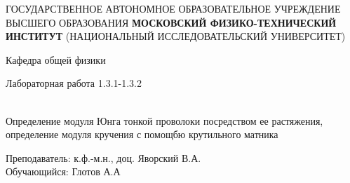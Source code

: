 \documentclass[12pt,a4paper]{article}
\author{Глотов Алексей}
\begin{document}
\newpage
\begin{center}
\footnotesize{{ГОСУДАРСТВЕННОЕ АВТОНОМНОЕ ОБРАЗОВАТЕЛЬНОЕ УЧРЕЖДЕНИЕ}\break
{ВЫСШЕГО ОБРАЗОВАНИЯ}
\break
{\bf {МОСКОВСКИЙ ФИЗИКО-ТЕХНИЧЕСКИЙ ИНСТИТУТ}}
\break
\small{(НАЦИОНАЛЬНЫЙ ИССЛЕДОВАТЕЛЬСКИЙ УНИВЕРСИТЕТ)}}
\break
\hfill \break
\hfill \break
\begin{center}
\normalsize{Кафедра общей физики}
\end{center}
\hfill \break
\hfill \break
\hfill \break
\hfill \break

\begin{center}
\normalsize {Лабораторная работа 1.3.1-1.3.2}
\end{center}
\hfill \break\\
\large{Определение модуля Юнга тонкой проволоки посредством ее растяжения, определение модуля кручения с помощбю крутильного матника}
\end{center}
\begin{flushleft}
\hfill \break
\hfill \break
\hfill \break
\hfill \break
\hfill \break
\hfill \break
\hfill \break
\hfill \break
\hfill \break
\hfill \break
\hangindent=9cm
\normalsize{Преподаватель:}\hfill
\normalsize{к.ф.-м.н., доц. Яворский В.А.}\\
\hfill \break
\normalsize{Обучающийся:}\hfill
\normalsize{Глотов А.А} \\
\hfill \break
\end{flushleft}
\hfill \break
\hfill \break
\hfill \break
\hfill \break
\hfill \break
\hfill \break
\hfill \break
\hfill \break
\hfill \break
\hfill \break
\hfill \break
\end{document}
